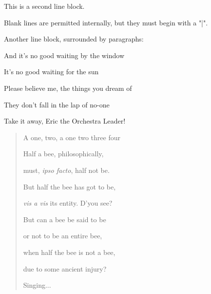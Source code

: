 \documentclass[a4paper]{article}
\newenvironment{DUlineblock}[1]{%
    \list{}{\setlength{\partopsep}{\parskip}
            \addtolength{\partopsep}{\baselineskip}
            \setlength{\topsep}{0pt}
            \setlength{\itemsep}{0.15\baselineskip}
            \setlength{\parsep}{0pt}
            \setlength{\leftmargin}{#1}}
    \raggedright
  }
  {\endlist}
\begin{document}
\begin{DUlineblock}{0em}
\item[] This is a second line block.
\item[] 
\item[] Blank lines are permitted internally, but they must begin with a "|".
\end{DUlineblock}

Another line block, surrounded by paragraphs:

\begin{DUlineblock}{0em}
\item[] And it's no good waiting by the window
\item[] It's no good waiting for the sun
\item[] Please believe me, the things you dream of
\item[] They don't fall in the lap of no-one
\end{DUlineblock}

Take it away, Eric the Orchestra Leader!
%
\begin{quote}

\begin{DUlineblock}{0em}
\item[] A one, two, a one two three four
\item[] 
\item[] Half a bee, philosophically,
\item[]
\begin{DUlineblock}{\DUlineblockindent}
\item[] must, \emph{ipso facto}, half not be.
\end{DUlineblock}
\item[] But half the bee has got to be,
\item[]
\begin{DUlineblock}{\DUlineblockindent}
\item[] \emph{vis a vis} its entity.  D'you see?
\item[] 
\end{DUlineblock}
\item[] But can a bee be said to be
\item[]
\begin{DUlineblock}{\DUlineblockindent}
\item[] or not to be an entire bee,
\item[]
\begin{DUlineblock}{\DUlineblockindent}
\item[] when half the bee is not a bee,
\item[]
\begin{DUlineblock}{\DUlineblockindent}
\item[] due to some ancient injury?
\item[] 
\end{DUlineblock}
\end{DUlineblock}
\end{DUlineblock}
\item[] Singing...
\end{DUlineblock}

\end{quote}
\end{document}
